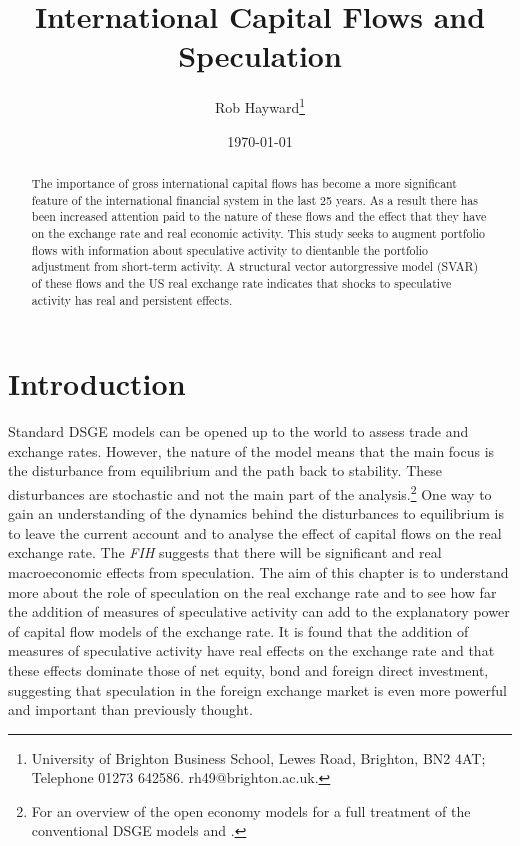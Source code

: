 \documentclass[12pt, a4paper, oneside]{article}\usepackage[]{graphicx}\usepackage[]{color}
\begin{document}
\title{International Capital Flows and Speculation}
\author{Rob Hayward\footnote{University of Brighton Business School, Lewes Road, Brighton, BN2 4AT; Telephone 01273 642586.  rh49@brighton.ac.uk. }} 
\date{\today}
\maketitle
\begin{abstract}
The importance of gross international capital flows has become a more significant feature of the international financial system in the last 25 years.  As a result there has been increased attention paid to the nature of these flows and the effect that they have on the exchange rate and real economic activity.  This study seeks to augment portfolio flows with information about speculative activity to dientanble the portfolio adjustment from short-term activity.  A structural vector autorgressive model (SVAR) of these flows and the US real exchange rate indicates that shocks to speculative activity has real and persistent effects.   
\end{abstract}
\section*{Introduction}
Standard DSGE models can be opened up to the world to assess trade and exchange rates.  However, the nature of the model means that the main focus is the disturbance from equilibrium and the path back to stability.  These disturbances are stochastic and  not the main part of the analysis.\footnote{For an overview of the open economy models \citep{Obstfeld1995Redux} for a full treatment of the conventional DSGE models \citep{Woodford2003} and \citep{OandR}.}  One way to gain an understanding of the dynamics behind the disturbances to equilibrium is to leave the current account and to analyse the effect of capital flows on the real exchange rate.    The \emph{FIH} suggests that there will be significant and real macroeconomic effects from speculation.  The aim of this chapter is to understand more about the role of speculation on the real exchange rate and to see how far the addition of measures of speculative activity can add to the explanatory power of capital flow models of the exchange rate.    It is found that the addition of measures of speculative activity have real effects on the exchange rate and that these effects dominate those of net equity, bond and foreign direct investment, suggesting that speculation in the foreign exchange market is even more powerful and important than previously thought.  %
\end{document}
